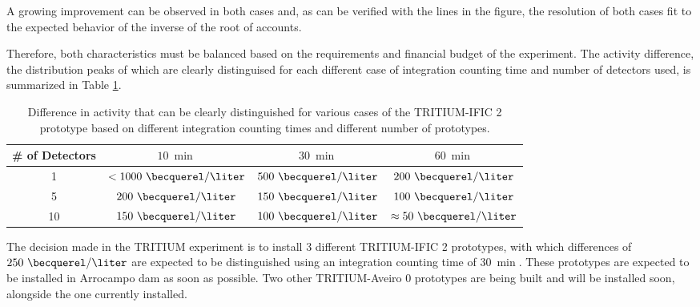 A growing improvement can be observed in both cases and, as can be verified with the lines in the figure, the resolution of both cases fit to the expected behavior of the inverse of the root of accounts.

Therefore, both characteristics must be balanced based on the requirements and financial budget of the experiment. The activity difference, the distribution peaks of which are clearly distinguised for each different case of integration counting time and number of detectors used, is summarized in Table \ref{tab:DifferentCasesOfTI2}.

\begin{table}[h]
\begin{center}
\begin{tabular}{|c|c|c|c|}
\hline
\# of Detectors & $10~\min$ & $30~\min$ & $60~\min$\\
\hline \hline \hline
1 & $<1000~\becquerel/\liter$ & $500~\becquerel/\liter$ & $200~\becquerel/\liter$ \\ \hline
5 & $200~\becquerel/\liter$ & $150~\becquerel/\liter$ & $100~\becquerel/\liter$ \\\hline
10 & $150~\becquerel/\liter$ & $100~\becquerel/\liter$ & $\approx 50~\becquerel/\liter$ \\ \hline
\end{tabular}
\caption{Difference in activity that can be clearly distinguished for various cases of the TRITIUM-IFIC 2 prototype based on different integration counting times and different number of prototypes.}
\label{tab:DifferentCasesOfTI2}
\end{center}
\end{table}

The decision made in the TRITIUM experiment is to install 3 different TRITIUM-IFIC 2 prototypes, with which differences of $250~\becquerel/\liter$ are expected to be distinguished using an integration counting time of $30~\min$. These prototypes are expected to be installed  in Arrocampo dam as soon as possible. Two other TRITIUM-Aveiro 0 prototypes are being built and will be installed soon, alongside the one currently installed.





